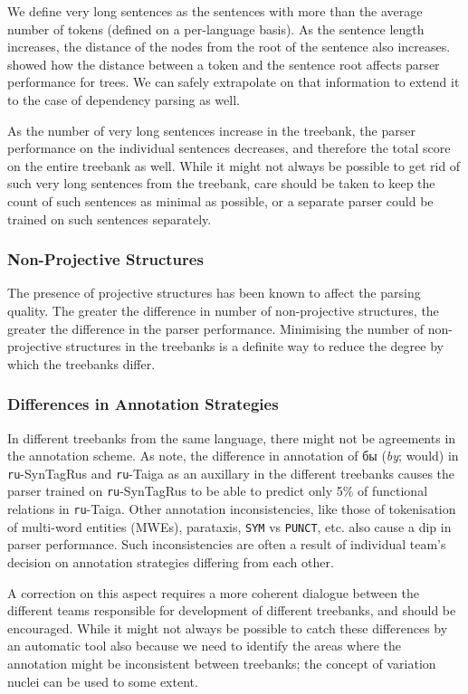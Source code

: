 We define very long sentences as the sentences with more than the average number of tokens (defined on a per-language basis). As the sentence length increases, the distance of the nodes from the root of the sentence also increases. \cite{collins} showed how the distance between a token and the sentence root affects parser performance for trees. We can safely extrapolate on that information to extend it to the case of dependency parsing as well.

As the number of very long sentences increase in the treebank, the parser performance on the individual sentences decreases, and therefore the total score on the entire treebank as well. While it might not always be possible to get rid of such very long sentences from the treebank, care should be taken to keep the count of such sentences as minimal as possible, or a separate parser could be trained on such sentences separately.

\subsubsection{Non-Projective Structures}

The presence of projective structures has been known to affect the parsing quality. The greater the difference in number of non-projective structures, the greater the difference in the parser performance. Minimising the number of non-projective structures in the treebanks is a definite way to reduce the degree by which the treebanks differ.

\subsubsection{Differences in Annotation Strategies}

In different treebanks from the same language, there might not be agreements in the annotation scheme. As \cite{RussianTreebanks} note, the difference in annotation of \textrussian{бы} (\textit{by}; would) in \verb|ru|-SynTagRus and \verb|ru|-Taiga as an auxillary in the different treebanks causes the parser trained on \verb|ru|-SynTagRus to be able to predict only 5\% of functional relations in \verb|ru|-Taiga. Other annotation inconsistencies, like those of tokenisation of multi-word entities (MWEs), parataxis, \verb|SYM| vs \verb|PUNCT|, etc. also cause a dip in parser performance. Such inconsistencies are often a result of individual team's decision on annotation strategies differing from each other.

A correction on this aspect requires a more coherent dialogue between the different teams responsible for development of different treebanks, and should be encouraged. While it might not always be possible to catch these differences by an automatic tool also because we need to identify the areas where the annotation might be inconsistent between treebanks; the concept of variation nuclei \citep{boyd} can be used to some extent.

